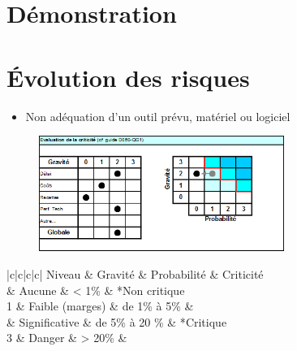 \documentclass[xcolor=dvipsnames]{beamer}
\begin{document}

\section{D\'emonstration}





\section{\'Evolution des risques}


	\newcommand{\legendeRisque}{
		\small
		\begin{tabular}{|c|c|c|c|}
			\hline
			Niveau & Gravit\'e & Probabilit\'e & Criticit\'e \\
			\hline
			\hline
			0 & Aucune & < 1\% & \multirow{2}*{Non critique}\\
			\cline{1-3}
			1 & Faible (marges) & de 1\% à 5\% & \\
			\hline
			2 & Significative & de 5\% à 20 \% & \multirow{2}*{Critique}\\
			\cline{1-3}
			3 & Danger & > 20\% & \\
			\hline
		\end{tabular}
	}


	\begin{frame}{\secname}
		\begin{itemize}
			\item Non ad\'equation d'un outil pr\'evu, mat\'eriel ou logiciel
		\end{itemize}
		\begin{figure}
			\includegraphics[width=8cm]{risque_outil.png}
		\end{figure}
		\begin{center}
			\legendeRisque
		\end{center}
	\end{frame}
\end{document}

